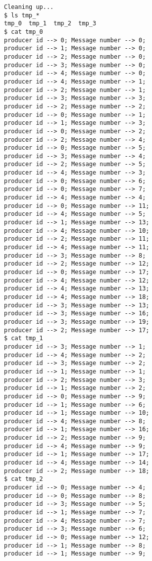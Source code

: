 \documentclass[11pt]{article}
\begin{document}
\begin{question}
\begin{subquestion}
\begin{verbatim}
Cleaning up...
$ ls tmp_*
tmp_0  tmp_1  tmp_2  tmp_3
$ cat tmp_0
producer id --> 0; Message number --> 0;
producer id --> 1; Message number --> 0;
producer id --> 2; Message number --> 0;
producer id --> 3; Message number --> 0;
producer id --> 4; Message number --> 0;
producer id --> 4; Message number --> 1;
producer id --> 2; Message number --> 1;
producer id --> 3; Message number --> 3;
producer id --> 2; Message number --> 2;
producer id --> 0; Message number --> 1;
producer id --> 1; Message number --> 3;
producer id --> 0; Message number --> 2;
producer id --> 2; Message number --> 4;
producer id --> 0; Message number --> 5;
producer id --> 3; Message number --> 4;
producer id --> 2; Message number --> 5;
producer id --> 4; Message number --> 3;
producer id --> 0; Message number --> 6;
producer id --> 0; Message number --> 7;
producer id --> 4; Message number --> 4;
producer id --> 0; Message number --> 11;
producer id --> 4; Message number --> 5;
producer id --> 1; Message number --> 13;
producer id --> 4; Message number --> 10;
producer id --> 2; Message number --> 11;
producer id --> 4; Message number --> 11;
producer id --> 3; Message number --> 8;
producer id --> 2; Message number --> 12;
producer id --> 0; Message number --> 17;
producer id --> 4; Message number --> 12;
producer id --> 4; Message number --> 13;
producer id --> 4; Message number --> 18;
producer id --> 3; Message number --> 13;
producer id --> 3; Message number --> 16;
producer id --> 3; Message number --> 19;
producer id --> 2; Message number --> 17;
$ cat tmp_1
producer id --> 3; Message number --> 1;
producer id --> 4; Message number --> 2;
producer id --> 3; Message number --> 2;
producer id --> 1; Message number --> 1;
producer id --> 2; Message number --> 3;
producer id --> 1; Message number --> 2;
producer id --> 0; Message number --> 9;
producer id --> 1; Message number --> 6;
producer id --> 1; Message number --> 10;
producer id --> 4; Message number --> 8;
producer id --> 1; Message number --> 16;
producer id --> 2; Message number --> 9;
producer id --> 4; Message number --> 9;
producer id --> 1; Message number --> 17;
producer id --> 4; Message number --> 14;
producer id --> 2; Message number --> 18;
$ cat tmp_2
producer id --> 0; Message number --> 4;
producer id --> 0; Message number --> 8;
producer id --> 3; Message number --> 5;
producer id --> 1; Message number --> 7;
producer id --> 4; Message number --> 7;
producer id --> 3; Message number --> 6;
producer id --> 0; Message number --> 12;
producer id --> 1; Message number --> 8;
producer id --> 1; Message number --> 9;

\end{verbatim}
\end{subquestion}
\end{question}
\end{document}
